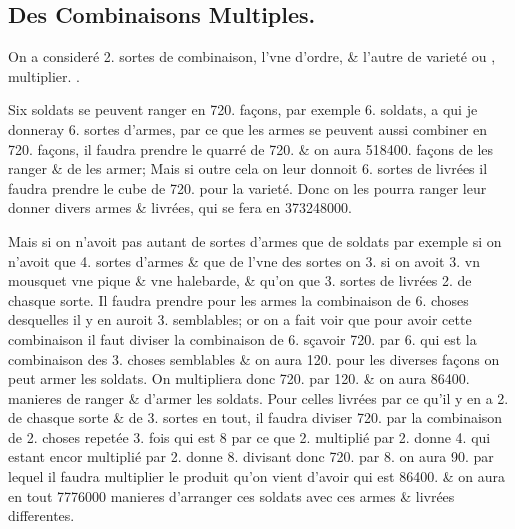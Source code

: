 \documentclass[11pt,a4paper]{article}
\begin{document}

\subsection*{Des Combinaisons Multiples.}

On a consideré 2. sortes de combinaison, l'vne d'ordre, \& l'autre de varieté ou , \struck{\ill{}} multiplier. .

Six soldats se peuvent ranger en 720. façons,  par exemple 6. soldats, a qui je donneray 6. sortes d'armes, par ce que les armes se peuvent aussi combiner en 720. façons, il faudra prendre le quarré de 720. \& on aura 518400. façons de les ranger \& de les armer; Mais si outre cela on leur donnoit 6. sortes de livrées il faudra prendre le cube de 720. pour la varieté. Donc on les pourra ranger \struck{\&} \struck{\ill{}} leur donner divers armes \& livrées, \struck{\ill{}} \ill{} qui se fera en 373248000.

Mais si on n'avoit pas autant de sortes d'armes  que de soldats par exemple si on n'avoit que  4. sortes d'armes \& que de l'vne des sortes on  3.  si on avoit 3.  vn mousquet vne pique \& vne halebarde, \& qu'on  que 3. sortes de livrées  2. de chasque sorte. Il faudra prendre pour les armes la combinaison de 6. choses desquelles il y en auroit 3. semblables; or on a fait voir que pour avoir cette combinaison il faut diviser la combinaison de 6. sçavoir 720. par 6. qui est la combinaison des 3. choses semblables \struck{\ill{}} \& on aura 120. pour les diverses façons  on peut armer les soldats. On multipliera donc 720. par 120. \& on aura 86400. manieres de ranger \& d'armer les soldats. Pour celles livrées par ce qu'il y en a 2. de chasque sorte \& de 3. sortes en tout, il faudra diviser 720. par la combinaison de 2. choses repetée 3. fois qui est 8 par ce que 2. multiplié par 2. donne 4. qui estant encor multiplié par 2. donne 8. divisant donc 720. par 8. on aura 90. par lequel il faudra multiplier le produit qu'on vient d'avoir qui est 86400. \& on aura en tout 7776000 manieres d'arranger ces soldats avec ces armes \& livrées differentes.
\end{document}

